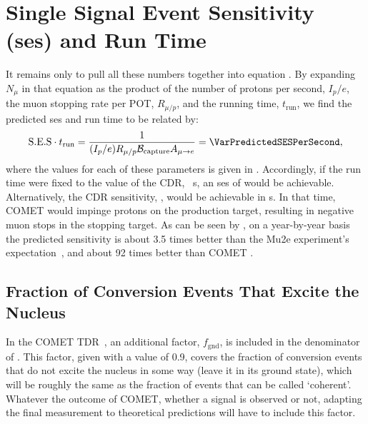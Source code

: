 \section{Single Signal Event Sensitivity (\acs{ses}) and Run Time}
\TabSensParams
It remains only to pull all these numbers together into equation .
By expanding $N_\mu$ in that equation as the product of the number of protons per second, $I_p/e$, the muon stopping rate per \ac{POT}, $R_{\mu/p}$, and the running time, $t_\textrm{run}$, we find the predicted \ac{ses} and run time to be related by:
\begin{align}
	\eqlabel{sense:runtime}
	\mathrm{S.E.S}\cdot{}t_\textrm{run}=\frac{1}{(I_p/e){R}_{\mu/p}\mathcal{B}_\mathrm{capture} A_{\mu\rightarrow e}}=\VarPredictedSESPerSecond,
\end{align}
where the values for each of these parameters is given in .  
Accordingly, if the run time were fixed to the value of the CDR, \VarCDRRunTime[2]~s, an \ac{ses} of \VarPredictedSESCDRRunTime would be achievable.
Alternatively, the CDR sensitivity, \VarPredictedSES, would be achievable in \VarRunTime[2]s.  
In that time, COMET \phaseII would impinge \VarTotalPOT protons on the production target, resulting in \VarTotalMuStops negative muon stops in the stopping target.
As can be seen by , on a year-by-year basis the predicted \phaseII sensitivity is about 3.5 times better than the Mu2e experiment's expectation~\cite{Mu2e2014}, and about 92 times better than COMET \phaseI.
\TabSensEstimates

\subsection{Fraction of Conversion Events That Excite the Nucleus}
In the COMET \phaseI TDR~\cite{TDR2016}, an additional factor, $f_\textrm{gnd}$, is included in the denominator of .
This factor, given with a value of 0.9, covers the fraction of conversion events that do not excite the nucleus in some way (\ie leave it in its ground state), which will be roughly the same as the fraction of events that can be called `coherent'.
Whatever the outcome of COMET, whether a signal is observed or not, adapting the final measurement to theoretical predictions will have to include this factor.

